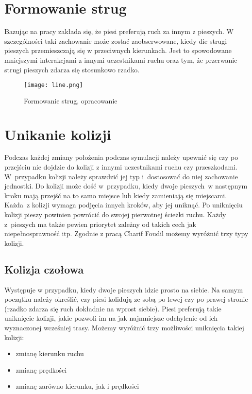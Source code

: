 \section{Formowanie strug}
\label{sec:strugi}

Bazując na pracy \cite{HeBuAjTw} zakłada się, że piesi preferują ruch za innym z pieszych. W szczególności taki zachowanie może zostać zaobserwowane, kiedy die strugi pieszych przemieszczają się w przeciwnych kierunkach. Jest to spowodowane mniejszymi interakcjami z innymi uczestnikami ruchu oraz tym, że przerwanie strugi pieszych zdarza się stosunkowo rzadko.

\begin{figure}
\centering
\texttt{[image: line.png]}
\caption{Formowanie strug, opracowanie \cite{HeBuAjTw}}
\end{figure}

\section{Unikanie kolizji}
\label{sec:kolizje}

Podczas każdej zmiany położenia podczas symulacji należy upewnić się czy po przejściu nie dojdzie do kolizji z innymi uczestnikami ruchu czy przeszkodami. W~przypadku kolizji należy sprawdzić jej typ i~dostosować do niej zachowanie jednostki. Do kolizji może dość w~przypadku, kiedy dwoje pieszych~w następnym kroku mają przejść na to samo miejsce lub kiedy zamieniają się miejscami. Każda~z kolizji wymaga podjęcia innych kroków, aby jej uniknąć. Po uniknięciu kolizji pieszy powinien powrócić do swojej pierwotnej ścieżki ruchu. Każdy z~pieszych ma także pewien priorytet zależny od takich cech jak niepełnosprawność itp. Zgodnie z pracą Charif Foudil \cite{Collision} możemy wyróżnić trzy typy kolizji.

\subsection{Kolizja czołowa}

Występuje w przypadku, kiedy dwoje pieszych idzie prosto na siebie. Na samym początku należy określić, czy piesi kolidują ze sobą po lewej czy po prawej stronie (rzadko zdarza się ruch dokładnie na wprost siebie). Piesi preferują takie uniknięcie kolizji, jakie pozwoli im na jak najmniejsze odchylenie od ich wyznaczonej wcześniej trasy. Możemy wyróżnić trzy możliwości uniknięcia takiej kolizji:

\begin{itemize}
\item zmianę kierunku ruchu
\item zmianę prędkości
\item zmianę zarówno kierunku, jak i prędkości
\end{itemize}

